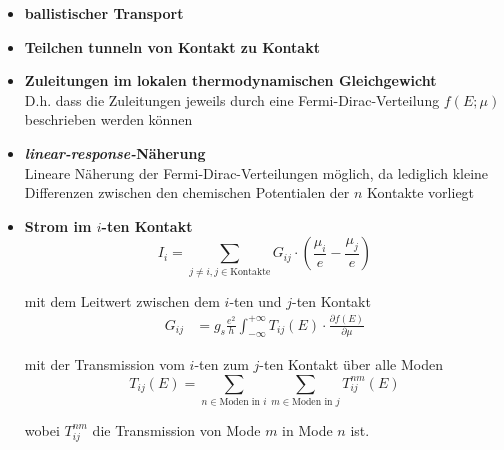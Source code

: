 \documentclass{article}
\newcommand{\lr}[1]{\left(#1\right)}
\begin{document}
	\begin{itemize}
		\item \textbf{ballistischer Transport}
		
		
		\item \textbf{Teilchen tunneln von Kontakt zu Kontakt}


		\item \textbf{Zuleitungen im lokalen thermodynamischen Gleichgewicht}\\
		D.h. dass die Zuleitungen jeweils durch eine Fermi-Dirac-Verteilung $f(E;\mu)$ beschrieben werden können
		
		
		\item \textbf{\textit{linear-response-}Näherung}\\
		Lineare Näherung der Fermi-Dirac-Verteilungen möglich, da lediglich kleine Differenzen zwischen den chemischen Potentialen der $n$ Kontakte vorliegt
	\end{itemize}


	\begin{itemize}
		\item \textbf{Strom im $i$-ten Kontakt}
			\begin{equation}
				I_i = \sum_{j \neq i, j \in \text{Kontakte}} G_{ij} \cdot \lr{ \frac{\mu_i}{e} - \frac{\mu_j}{e} }
			\end{equation}
		
		mit dem Leitwert zwischen dem $i$-ten und $j$-ten Kontakt
			\begin{align}
				G_{ij} &= g_s\frac{e^2}{h} \int_{-\infty}^{+\infty} T_{ij}(E) \cdot \frac{\partial f(E)}{\partial \mu}
			\end{align}
			
		mit der Transmission vom $i$-ten zum $j$-ten Kontakt über alle Moden
			\begin{equation}
				T_{ij}(E) = \sum_{n \in \text{Moden in } i} \sum_{m \in \text{Moden in } j} T_{ij}^{nm}(E)
			\end{equation}
		
		wobei $T_{ij}^{nm}$ die Transmission von Mode $m$ in Mode $n$ ist.
	\end{itemize}


\newpage
\end{document}
